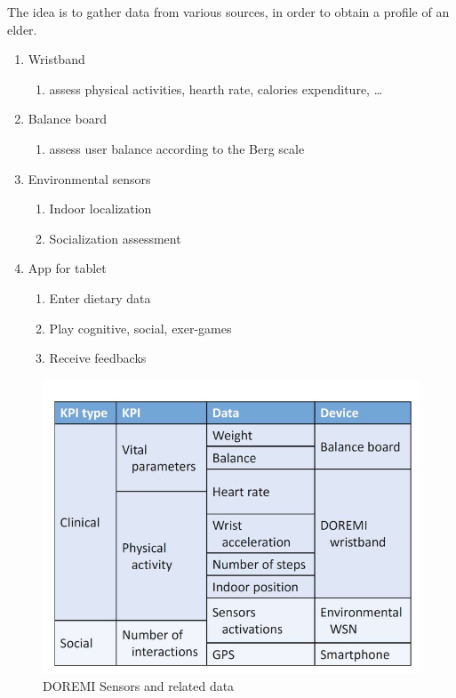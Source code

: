 \begin{paracol}{2}
   The idea is to gather data from various sources, in order to obtain a profile of an elder.
   \begin{enumerate}
      \item Wristband
      \begin{enumerate}
         \item assess physical activities, hearth rate, calories
         expenditure, \dots
      \end{enumerate}
         \item Balance board
      \begin{enumerate}
         \item assess user balance according to the Berg scale
      \end{enumerate}
      \item Environmental sensors
      \begin{enumerate}
         \item Indoor localization
         \item Socialization assessment
      \end{enumerate}
      \item App for tablet
      \begin{enumerate}
         \item Enter dietary data
         \item Play cognitive, social, exer-games
         \item Receive feedbacks
      \end{enumerate}
   \end{enumerate}
   \switchcolumn
   \begin{figure}[htbp]
      \centering
      \includegraphics{images/doremi_sensors.png}
      \caption{DOREMI Sensors and related data}
      \label{fig:doremi_sensors}
   \end{figure}

\end{paracol}

